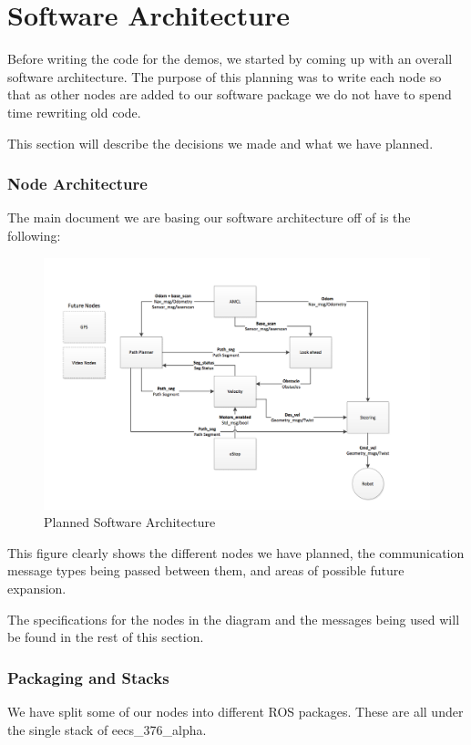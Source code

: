 \part{Software Architecture}

Before writing the code for the demos, we started by coming up with an
overall software architecture.  The purpose of this planning was to
write each node so that as other nodes are added to our software
package we do not have to spend time rewriting old code.

This section will describe the decisions we made and what we have
planned.

\section{Node Architecture}

The main document we are basing our software architecture off of is
the following:

\FloatBarrier
\begin{figure}[h]
  \includegraphics[width=8.0in]{software_architecture_diagram}
  \caption{Planned Software Architecture}
\end{figure}
\FloatBarrier

This figure clearly shows the different nodes we have planned, the
communication message types being passed between them, and areas of
possible future expansion.

The specifications for the nodes in the diagram and the messages being
used will be found in the rest of this section.

\section{Packaging and Stacks}
We have split some of our nodes into different ROS packages.  These
are all under the single stack of eecs\_376\_alpha.

